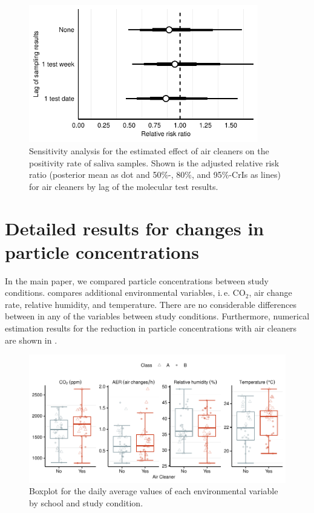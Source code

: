 \documentclass[fleqn,11pt]{wlscirep_supp}
\newcommand\ie{i.\,e.\xspace}
\begin{document}
\begin{figure}[!htb]
\centering
    \includegraphics[width=10cm]{../../results/mol-data/model-results.pdf}
    \caption[Sensitivity analysis for the estimated effect of air cleaners on the positivity rate of saliva samples]{Sensitivity analysis for the estimated effect of air cleaners on the positivity rate of saliva samples. Shown is the adjusted relative risk ratio (posterior mean as dot and 50\%-, 80\%, and 95\%-CrIs as lines) for air cleaners by lag of the molecular test results.}
    \label{fig:mol-estimation-results-sensitivity}
\end{figure}

\clearpage

\section{Detailed results for changes in particle concentrations}\label{sec:detailed-palas}

In the main paper, we compared particle concentrations between study conditions.  compares additional environmental variables, \ie CO$_2$, air change rate, relative humidity, and temperature. There are no considerable differences between in any of the variables between study conditions. Furthermore, numerical estimation results for the reduction in particle concentrations with air cleaners are shown in .

\begin{figure}[!htb]
\centering
    \includegraphics[width=\linewidth]{../../results/env-data/otherVars-boxplot.pdf}
    \caption[Boxplot of environmental variables by school and study condition]{Boxplot for the daily average values of each environmental variable by school and study condition.}
    \label{fig:env-descriptives-other-vars}
\end{figure}
\end{document}
